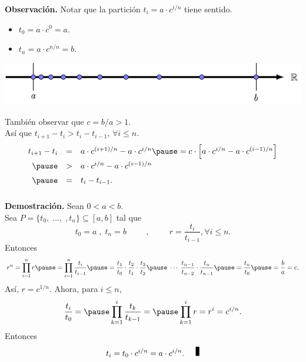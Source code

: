 \documentclass{beamer}
\begin{document}
\begin{frame}[t,fragile]
	\frametitle{\secname}
	\textbf{Observación.} 
	Notar que la partición \(t_i = a \cdot c^{i/n}\) tiene sentido.
	\begin{itemize}
		\item \(t_0 = a \cdot c^0 = a\).
		\item \(t_n = a \cdot c ^ {n/n} = b\).
	\end{itemize}
	\pause
	\begin{center}
		\includegraphics[width= \linewidth, page = 1]{IMAGES/1/1.pdf}
	\end{center}
	También observar que \(c = b/a > 1\). \\ \pause
	Así que \(t_{i+1} - t_i > t_i - t_{i-1}\), \(\forall i \leqslant n\). \pause
	\[
		\begin{array}{rcl}
			t_{i+1} - t_i & = & a \cdot c^ {(i+1) / n} - a \cdot c^ {i/n}
			\pause
			= c \cdot \Big[a \cdot c^ {i/n} - a \cdot c^ {(i-1) /n}\Big] \\[2mm]
			\pause
			& > & a \cdot c^ {i/n} - a \cdot c^ {(i-1) /n} \\[2mm] 
			\pause
			& = & t_{i} - t_{i-1} .
		\end{array}
	\]
\end{frame}

\begin{frame}[t,fragile]
	\frametitle{\secname}
	\textbf{Demostración.} Sean \(0 < a < b\). \\
	Sea \(P = \{t_0, \;\ldots,\; ,t_n\} \subseteq [a,b]\) tal que 
	\[
		t_0 = a \;,\; t_n = b
		\hspace{1cm},\hspace{1cm} r = \dfrac{t_i}{t_{i-1}}, \forall i \leqslant  n.
	\]
	\pause
	Entonces
	\[
		r^n = \dis\prod_{i=1}^{n} r \pause
		= \dis\prod_{i=1}^{n} \dfrac{t_i}{t_{i-1}} \pause
		= \dfrac{t_1}{t_0} \cdot \dfrac{t_2}{t_1} \cdot \dfrac{t_3}{t_2} \pause
		\;\cdots\; \dfrac{t_{n-1}}{t_{n-2}} \cdot \dfrac{t_n}{t_{n-1}} \pause
		= \dfrac{t_n}{t_0} \pause
		= \dfrac{b}{a} = c.
	\]
	Así, \(r = c^ {1/n}\). \pause
	Ahora, para \(i \leqslant n\),
	\[
		\dfrac{t_i}{t_0} = \pause
		\dis\prod_{k=1}^{i} \dfrac{t_k}{t_{k-1}} = \pause
		\dis\prod_{k=1}^{i} r = r^i = c^ {i/n}.
	\]
	Entonces
	\[
		t_i = t_0 \cdot c^ {i/n} = a \cdot c^ {i/n}. \qed
	\]
\end{frame}
\end{document}
